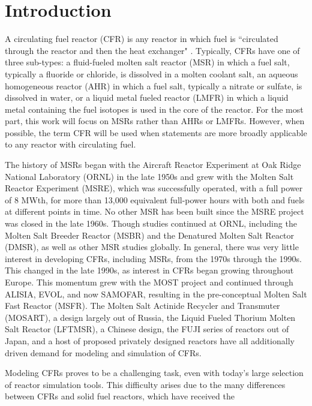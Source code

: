 \documentclass[review]{elsarticle}
\begin{document}
\section{Introduction} \label{sec:intro}
A circulating fuel reactor (CFR) is any reactor in which fuel is ``circulated
 through the reactor and then the heat exchanger" \cite{ergen_1954}.
 Typically, CFRs have one of three sub-types: a fluid-fueled molten salt reactor
 (MSR) in which a fuel salt, typically a fluoride or chloride, is dissolved
 in a molten coolant salt, an aqueous homogeneous reactor (AHR) in which
 a fuel salt, typically a nitrate or sulfate, is dissolved in water, or a
 liquid metal fueled reactor (LMFR) in which a liquid metal containing the fuel
 isotopes is used in the core of the reactor.
 For the most part, this work will focus on MSRs rather than AHRs or LMFRs. However,
 when possible, the term CFR will be used when statements are more broadly
 applicable to any reactor with circulating fuel.
\par The history of MSRs began with the Aircraft Reactor Experiment at Oak Ridge National
 Laboratory (ORNL) in the late 1950s and grew with the Molten Salt Reactor Experiment
 (MSRE), which was successfully operated, with a full power of 8 MWth, for more than 13,000
 equivalent full-power hours with both  and  fuels at different
points in time. No other MSR has been built since the MSRE project was closed
 in the late 1960s. Though studies continued at ORNL, including the Molten Salt Breeder
 Reactor (MSBR) and the Denatured Molten Salt Reactor (DMSR), as well as other MSR studies
 globally. In general, there was very little interest in
 developing CFRs, including MSRs, from the 1970s through the 1990s.  This
 changed in the late 1990s, as interest in CFRs began growing throughout Europe. This momentum
grew with the MOST project and continued through ALISIA, EVOL, and now SAMOFAR, resulting in
the pre-conceptual Molten Salt Fast Reactor (MSFR). The Molten Salt Actinide
Recycler and Transmuter (MOSART), a design largely out of Russia, the
Liquid Fueled Thorium Molten Salt Reactor (LFTMSR), a Chinese design, the
FUJI series of reactors out of Japan, and a host of proposed privately designed
reactors have all additionally driven demand for
modeling and simulation of CFRs. 
\par Modeling CFRs proves to be a challenging task, even with today's
large selection of reactor simulation tools. This difficulty arises due to
the many differences between CFRs and solid fuel reactors, which have received the
\end{document}
